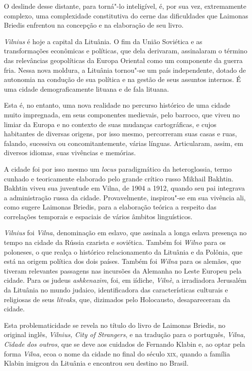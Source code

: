 O deslinde desse distante, para torná"-lo inteligível, é, por sua vez,
extremamente complexo, uma complexidade constitutiva do cerne das
dificuldades que Laimonas Briedis enfrentou na concepção e na elaboração
de seu livro.

\textit{\textit{Vilnius}} é hoje a capital da Lituânia. O fim da União Soviética e as
transformações econômicas e políticas, que dela derivaram, assinalaram o
término das relevâncias geopolíticas da Europa Oriental como um
componente da guerra fria. Nessa nova moldura, a Lituânia tornou"-se um
país independente, dotado de autonomia na condução de sua política e na
gestão de seus assuntos internos. É uma cidade demograficamente lituana
e de fala lituana.

Esta é, no entanto, uma nova realidade no percurso histórico de uma
cidade muito impregnada, em seus componentes medievais, pelo barroco,
que viveu no limiar da Europa e no contexto de suas mudanças
cartográficas, e cujos habitantes de diversas origens, por isso mesmo,
percorreram suas casas e ruas, falando, sucessiva ou concomitantemente,
várias línguas. Articularam, assim, em diversos idiomas, suas vivências
e memórias.

A cidade foi por isso mesmo um \textit{locus} paradigmático da
heteroglossia, termo cunhado e teoricamente elaborado pelo grande
crítico russo Mikhail Bakhtin. Bakhtin viveu sua juventude em Vilna, de
1904 a 1912, quando seu pai integrava a administração russa da cidade.
Provavelmente, inspirou"-se em sua vivência ali, como sugere Laimonas
Briedis, para a elaboração teórica a respeito das correlações temporais
e espaciais de vários âmbitos linguísticos.

\textit{\textit{Vilnius}} foi \textit{Vilna}, denominação em eslavo, que assinala a longa
eslava presença no tempo na cidade da Rússia czarista e soviética.
Também foi \textit{Wilno} para os poloneses, o que realça o histórico
relacionamento da Lituânia e da Polônia, que está na origem política dos
dois países. Também foi \textit{Wilna} para os alemães, que tiveram relevantes
passagens nas incursões da Alemanha no Leste Europeu pela cidade. Para
os judeus \textit{ashkenazim}, foi, em iídiche, \textit{Vilnè}, a irradiadora
Jerusalém da Lituânia no mundo judaico, identificadora das
características culturais e religiosas de seus \textit{litvaks}, que,
dizimados pelo Holocausto, desapareceram da cidade.

Esta problematicidade se revela no título do livro de Laimonas Briedis,
no original inglês, \textit{\textit{Vilnius}, City of Strangers}, e na tradução
para o português, \textit{Vilna, Cidade dos outros}, que se deve aos
cuidados de Fernando Klabin e, ao optar pela forma \textit{Vilna}, ecoa o nome
da cidade no final do século \textsc{xix}, quando a família Klabin imigrou da
Lituânia e encontrou seu destino no Brasil.

